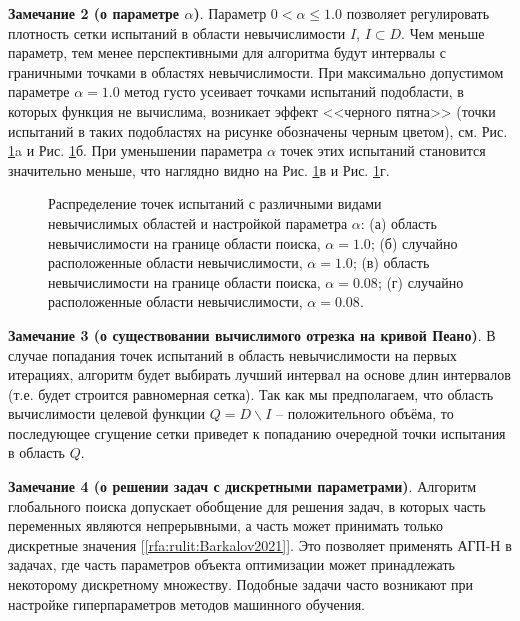 \documentclass[a4paper,12pt,russian]{article}
\begin{document}
\textbf{Замечание 2 (о параметре $\alpha$)}. Параметр $0 < \alpha \leq 1.0$ позволяет регулировать плотность сетки испытаний в области невычислимости $I$, $I \subset D$. Чем меньше параметр, тем менее перспективными для алгоритма будут интервалы с граничными точками в областях невычислимости. При максимально допустимом параметре $\alpha = 1.0$ метод густо усеивает точками испытаний подобласти, в которых функция не вычислима, возникает эффект <<черного пятна>> (точки испытаний в таких подобластях на рисунке обозначены черным цветом), см. Рис. \ref{task_61}a и Рис. \ref{task_61}б. При уменьшении параметра $\alpha$ точек этих испытаний становится значительно меньше, что наглядно видно на Рис. \ref{task_61}в и Рис. \ref{task_61}г.

\begin{figure}[h!]
	\caption{Распределение точек испытаний с различными видами невычислимых областей и настройкой параметра $\alpha$: (а) область невычислимости на границе области поиска, $\alpha = 1.0$; (б) случайно расположенные области невычислимости, $\alpha = 1.0$; (в) область невычислимости на границе области поиска, $\alpha = 0.08$; (г) случайно расположенные области невычислимости, $\alpha = 0.08$.}
	\label{task_61}
\end{figure}

\textbf{Замечание 3 (о существовании вычислимого отрезка на кривой Пеано)}. В случае попадания точек испытаний в область невычислимости на первых итерациях, алгоритм будет выбирать лучший интервал на основе длин интервалов (т.е. будет строится равномерная сетка). Так как мы предполагаем, что область вычислимости целевой функции $Q = D \backslash I$ -- положительного объёма, то последующее сгущение сетки приведет к попаданию очередной точки испытания в область $Q$.



\textbf{Замечание 4 (о решении задач с дискретными параметрами)}. Алгоритм глобального поиска допускает обобщение для решения задач, в которых часть переменных являются непрерывными, а часть может принимать только дискретные значения [\ref{rfa:rulit:Barkalov2021}]. Это позволяет применять АГП-Н в задачах, где часть параметров объекта оптимизации может принадлежать некоторому дискретному множеству. Подобные задачи часто возникают при настройке гиперпараметров методов машинного обучения.
\end{document}
